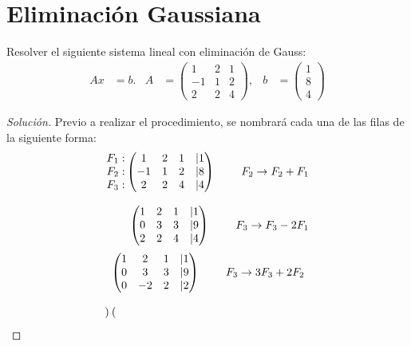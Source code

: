 \documentclass[12pt]{book}
\newenvironment{solucion}
  {\renewcommand\qedsymbol{$\square$}\begin{proof}[Solución]}
  {\end{proof}}
\begin{document}
\section{Eliminación Gaussiana}
\eje Resolver el siguiente sistema lineal con eliminación de Gauss:
\begin{align*}
    Ax&=b. & A&=\begin{pmatrix}
        1&2&1\\
        -1&1&2\\
        2&2&4
    \end{pmatrix}, & b&=\begin{pmatrix} 1\\ 8\\ 4\end{pmatrix}
\end{align*}
\begin{solucion}
Previo a realizar el procedimiento, se nombrará cada una de las filas de la siguiente forma:
\begin{align*}
    \begin{matrix}
        F_1 :\\
        F_2: \\
        F_3:
    \end{matrix} \begin{pmatrix}
         1 & 2 & 1 & | 1\\
        -1 & 1 & 2 & | 8 \\
         2 & 2 & 4 & | 4
    \end{pmatrix} \hspace{0.8cm} F_2 \rightarrow F_2 + F_1 \\[8pt]
    \begin{pmatrix}
        1 & 2 & 1 & | 1\\
        0 & 3 & 3 & | 9\\
        2 & 2 & 4 & | 4
    \end{pmatrix} \hspace{0.8cm} F_3 \rightarrow F_3 - 2F_1    
\end{align*}
\begin{align*}
    &\begin{pmatrix}
    1 & 2 & 1 & | 1 \\
    0 & 3 & 3 & | 9 \\
    0 & -2 & 2 & | 2
    \end{pmatrix} \hspace{0.8cm} F_3 \rightarrow 3F_3 + 2F_2 \\[8pt]
    &\begin{pmatrix}

\end{pmatrix}
\end{align*}
\end{solucion}
\end{document}
